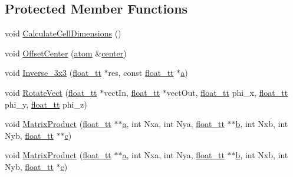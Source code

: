 \subsection*{Protected Member Functions}
\begin{DoxyCompactItemize}
\item 
void \hyperlink{class_q_s_t_e_m_1_1_c_crystal_a60f0a88329c4f7914baa0d14dbcb138a}{Calculate\-Cell\-Dimensions} ()
\item 
void \hyperlink{class_q_s_t_e_m_1_1_c_crystal_aa41cdd0a6e7780bf1c7337b6bde3277e}{Offset\-Center} (\hyperlink{namespace_q_s_t_e_m_a402dabc31a7a1fe906d0cdd138c69686}{atom} \&\hyperlink{_displacement_params_8m_a02389a9bda512aa8f8a3345f4fa27f25}{center})
\item 
void \hyperlink{class_q_s_t_e_m_1_1_c_crystal_a52cacab339b345feb973939ab13fb6f4}{Inverse\-\_\-3x3} (\hyperlink{namespace_q_s_t_e_m_a915d7caa497280d9f927c4ce8d330e47}{float\-\_\-tt} $\ast$res, const \hyperlink{namespace_q_s_t_e_m_a915d7caa497280d9f927c4ce8d330e47}{float\-\_\-tt} $\ast$\hyperlink{image_sim_8m_aa9c57d86c53f86ed6afc6339a0476363}{a})
\item 
void \hyperlink{class_q_s_t_e_m_1_1_c_crystal_a33c8dab1f453f33a9c172915ac174997}{Rotate\-Vect} (\hyperlink{namespace_q_s_t_e_m_a915d7caa497280d9f927c4ce8d330e47}{float\-\_\-tt} $\ast$vect\-In, \hyperlink{namespace_q_s_t_e_m_a915d7caa497280d9f927c4ce8d330e47}{float\-\_\-tt} $\ast$vect\-Out, \hyperlink{namespace_q_s_t_e_m_a915d7caa497280d9f927c4ce8d330e47}{float\-\_\-tt} phi\-\_\-x, \hyperlink{namespace_q_s_t_e_m_a915d7caa497280d9f927c4ce8d330e47}{float\-\_\-tt} phi\-\_\-y, \hyperlink{namespace_q_s_t_e_m_a915d7caa497280d9f927c4ce8d330e47}{float\-\_\-tt} phi\-\_\-z)
\item 
void \hyperlink{class_q_s_t_e_m_1_1_c_crystal_abcb641e6ea65daac00fa08f17a7dc0e0}{Matrix\-Product} (\hyperlink{namespace_q_s_t_e_m_a915d7caa497280d9f927c4ce8d330e47}{float\-\_\-tt} $\ast$$\ast$\hyperlink{image_sim_8m_aa9c57d86c53f86ed6afc6339a0476363}{a}, int Nxa, int Nya, \hyperlink{namespace_q_s_t_e_m_a915d7caa497280d9f927c4ce8d330e47}{float\-\_\-tt} $\ast$$\ast$\hyperlink{xyz2cfg_8m_a21ad0bd836b90d08f4cf640b4c298e7c}{b}, int Nxb, int Nyb, \hyperlink{namespace_q_s_t_e_m_a915d7caa497280d9f927c4ce8d330e47}{float\-\_\-tt} $\ast$$\ast$\hyperlink{image_sim_8m_a463b16ca2bfa2f0cbab0e62fcb263d8e}{c})
\item 
void \hyperlink{class_q_s_t_e_m_1_1_c_crystal_abcf8a241c7d15a5f8cd30011dac578a4}{Matrix\-Product} (\hyperlink{namespace_q_s_t_e_m_a915d7caa497280d9f927c4ce8d330e47}{float\-\_\-tt} $\ast$$\ast$\hyperlink{image_sim_8m_aa9c57d86c53f86ed6afc6339a0476363}{a}, int Nxa, int Nya, \hyperlink{namespace_q_s_t_e_m_a915d7caa497280d9f927c4ce8d330e47}{float\-\_\-tt} $\ast$$\ast$\hyperlink{xyz2cfg_8m_a21ad0bd836b90d08f4cf640b4c298e7c}{b}, int Nxb, int Nyb, \hyperlink{namespace_q_s_t_e_m_a915d7caa497280d9f927c4ce8d330e47}{float\-\_\-tt} $\ast$\hyperlink{image_sim_8m_a463b16ca2bfa2f0cbab0e62fcb263d8e}{c})
$$
\end{DoxyCompactItemize}
